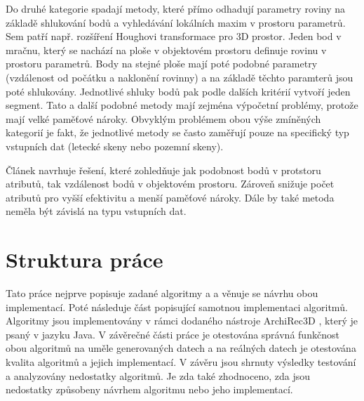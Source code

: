 \documentclass[11pt,twoside,a4paper]{book}
\begin{document}
Do druhé kategorie spadají metody, které přímo odhadují parametry roviny na základě shlukování bodů a vyhledávání lokálních maxim v prostoru parametrů. Sem patří např. rozšíření Houghovi transformace pro 3D prostor. Jeden bod v mračnu, který se nachází na ploše v objektovém prostoru definuje rovinu v prostoru parametrů. Body na stejné ploše mají poté podobné parametry (vzdálenost od počátku a naklonění rovinny) a na základě těchto paramterů jsou poté shlukovány. Jednotlivé shluky bodů pak podle dalších kritérií vytvoří jeden segment. Tato a další podobné metody mají zejména výpočetní problémy, protože mají velké paměťové nároky. Obvyklým problémem obou výše zmíněných kategorií je fakt, že jednotlivé metody se často zaměřují pouze na specifický typ vstupních dat (letecké skeny nebo pozemní skeny).

Článek \cite{Seg01} navrhuje řešení, které zohledňuje jak podobnost bodů v protstoru atributů, tak vzdálenost bodů v objektovém prostoru. Zároveň snižuje počet atributů pro vyšší efektivitu a menší paměťové nároky. Dále by také metoda neměla být závislá na typu vstupních dat.


\section{Struktura práce}

Tato práce nejprve popisuje zadané algoritmy \cite{Seg01} a \cite{Seg02} a věnuje se návrhu obou implementací. Poté následuje část popisující samotnou implementaci algoritmů. Algoritmy jsou implementovány v rámci dodaného nástroje ArchiRec3D \cite{AR3D}, který je psaný v jazyku Java. V závěrečné části práce je otestována správná funkčnost obou algoritmů na uměle generovaných datech a na reálných datech je otestována kvalita algoritmů a jejich implementací. V závěru jsou  shrnuty výsledky testování a analyzovány nedostatky algoritmů. Je zda také zhodnoceno, zda jsou nedostatky způsobeny návrhem algoritmu nebo jeho implementací.



\end{document}
